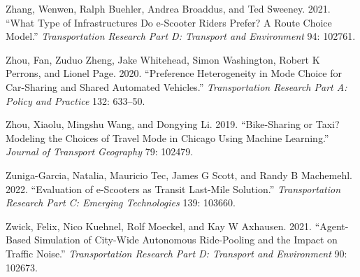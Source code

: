 \documentclass[12pt, oneside, openright]{byuthesis}
\newlength{\cslhangindent}
\newlength{\cslentryspacingunit} %
\newenvironment{CSLReferences}[2] %
 {%
  \setlength{\parindent}{0pt}
  \ifodd #1
  \let\oldpar\par
  \def\par{\hangindent=\cslhangindent\oldpar}
  \fi
  \setlength{\parskip}{#2\cslentryspacingunit}
 }%
 {}
\begin{document}
\begin{CSLReferences}{1}{0}
\leavevmode{}%
Zhang, Wenwen, Ralph Buehler, Andrea Broaddus, and Ted Sweeney. 2021. {``What Type of Infrastructures Do e-Scooter Riders Prefer? A Route Choice Model.''} \emph{Transportation Research Part D: Transport and Environment} 94: 102761.

\leavevmode{}%
Zhou, Fan, Zuduo Zheng, Jake Whitehead, Simon Washington, Robert K Perrons, and Lionel Page. 2020. {``Preference Heterogeneity in Mode Choice for Car-Sharing and Shared Automated Vehicles.''} \emph{Transportation Research Part A: Policy and Practice} 132: 633--50.

\leavevmode{}%
Zhou, Xiaolu, Mingshu Wang, and Dongying Li. 2019. {``Bike-Sharing or Taxi? Modeling the Choices of Travel Mode in Chicago Using Machine Learning.''} \emph{Journal of Transport Geography} 79: 102479.

\leavevmode{}%
Zuniga-Garcia, Natalia, Mauricio Tec, James G Scott, and Randy B Machemehl. 2022. {``Evaluation of e-Scooters as Transit Last-Mile Solution.''} \emph{Transportation Research Part C: Emerging Technologies} 139: 103660.

\leavevmode{}%
Zwick, Felix, Nico Kuehnel, Rolf Moeckel, and Kay W Axhausen. 2021. {``Agent-Based Simulation of City-Wide Autonomous Ride-Pooling and the Impact on Traffic Noise.''} \emph{Transportation Research Part D: Transport and Environment} 90: 102673.

\end{CSLReferences}


\end{document}
